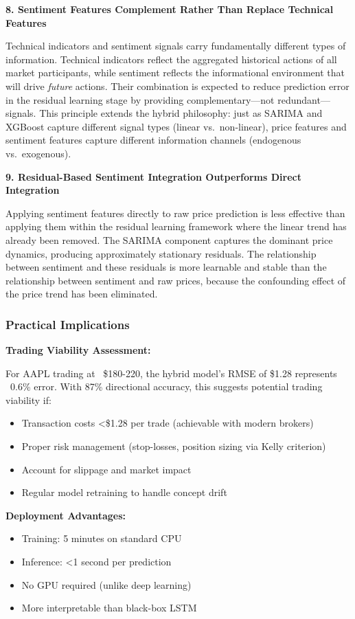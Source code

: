 \textbf{8. Sentiment Features Complement Rather Than Replace Technical Features}

Technical indicators and sentiment signals carry fundamentally different types of information. Technical indicators reflect the aggregated historical actions of all market participants, while sentiment reflects the informational environment that will drive \textit{future} actions. Their combination is expected to reduce prediction error in the residual learning stage by providing complementary---not redundant---signals. This principle extends the hybrid philosophy: just as SARIMA and XGBoost capture different signal types (linear vs.\ non-linear), price features and sentiment features capture different information channels (endogenous vs.\ exogenous).

\textbf{9. Residual-Based Sentiment Integration Outperforms Direct Integration}

Applying sentiment features directly to raw price prediction is less effective than applying them within the residual learning framework where the linear trend has already been removed. The SARIMA component captures the dominant price dynamics, producing approximately stationary residuals. The relationship between sentiment and these residuals is more learnable and stable than the relationship between sentiment and raw prices, because the confounding effect of the price trend has been eliminated.

\subsubsection{Practical Implications}

\textbf{Trading Viability Assessment:}

For AAPL trading at ~\$180-220, the hybrid model's RMSE of \$1.28 represents ~0.6\% error. With 87\% directional accuracy, this suggests potential trading viability if:
\begin{itemize}
    \item Transaction costs \textless \$1.28 per trade (achievable with modern brokers)
    \item Proper risk management (stop-losses, position sizing via Kelly criterion)
    \item Account for slippage and market impact
    \item Regular model retraining to handle concept drift
\end{itemize}

\textbf{Deployment Advantages:}
\begin{itemize}
    \item Training: 5 minutes on standard CPU
    \item Inference: \textless 1 second per prediction
    \item No GPU required (unlike deep learning)
    \item More interpretable than black-box LSTM
\end{itemize}

